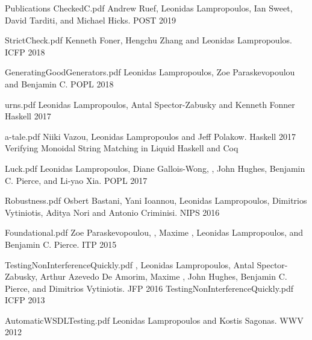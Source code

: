 \documentclass{resume} %
\begin{document}
\begin{rSection}{Publications}
    {CheckedC.pdf}
    {Andrew Ruef, Leonidas Lampropoulos, Ian Sweet, David Tarditi, and Michael Hicks.}
    {POST 2019}

    {StrictCheck.pdf}
    {Kenneth Foner, Hengchu Zhang and Leonidas Lampropoulos.}
    {ICFP 2018}

    {GeneratingGoodGenerators.pdf}
    {Leonidas Lampropoulos, Zoe Paraskevopoulou and Benjamin C.}
    {POPL 2018}

    {urns.pdf}
    {Leonidas Lampropoulos, Antal Spector-Zabusky and Kenneth Fonner}
    {Haskell 2017}

    {a-tale.pdf}
    {Niiki Vazou, Leonidas Lampropoulos and Jeff Polakow.}
    {Haskell 2017}
    {Verifying Monoidal String Matching in Liquid Haskell and Coq}

    {Luck.pdf}
    {Leonidas Lampropoulos, Diane Gallois-Wong, \Catalin \Hritcu, John Hughes, Benjamin C. Pierce, and Li-yao Xia.}
    {POPL 2017}

    {Robustness.pdf}
    {Osbert Bastani, Yani Ioannou, Leonidas Lampropoulos, Dimitrios Vytiniotis, Aditya Nori and Antonio Criminisi.}
    {NIPS 2016}

    {Foundational.pdf}
    {Zoe Paraskevopoulou, \Catalin \Hritcu, Maxime \Denes, Leonidas Lampropoulos, and Benjamin C. Pierce.}
    {ITP 2015}
    
    {TestingNonInterferenceQuickly.pdf}
    {\Catalin \Hritcu, Leonidas Lampropoulos, Antal Spector-Zabusky, Arthur
    Azevedo De Amorim, Maxime \Denes, John Hughes, Benjamin C. Pierce, and Dimitrios
    Vytiniotis.}
    {JFP 2016}
    {TestingNonInterferenceQuickly.pdf}
    {ICFP 2013}

    {AutomaticWSDLTesting.pdf}
    {Leonidas Lampropoulos and Kostis Sagonas.}
    {WWV 2012}
   
\end{rSection}


\end{document}
